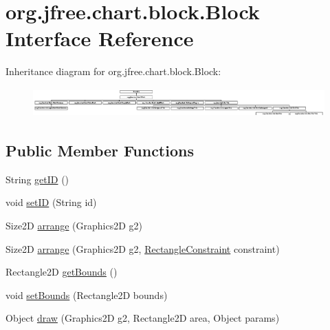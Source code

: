 \hypertarget{interfaceorg_1_1jfree_1_1chart_1_1block_1_1_block}{}\section{org.\+jfree.\+chart.\+block.\+Block Interface Reference}
\label{interfaceorg_1_1jfree_1_1chart_1_1block_1_1_block}
Inheritance diagram for org.\+jfree.\+chart.\+block.\+Block\+:\begin{figure}[H]
\begin{center}
\leavevmode
\includegraphics[height=1.115093cm]{interfaceorg_1_1jfree_1_1chart_1_1block_1_1_block}
\end{center}
\end{figure}
\subsection*{Public Member Functions}
\begin{DoxyCompactItemize}
\item 
String \mbox{\hyperlink{interfaceorg_1_1jfree_1_1chart_1_1block_1_1_block_ab362b055d3750130025daf376d874541}{get\+ID}} ()
\item 
void \mbox{\hyperlink{interfaceorg_1_1jfree_1_1chart_1_1block_1_1_block_acdfb9f36af8bef13785bb29e9752da58}{set\+ID}} (String id)
\item 
Size2D \mbox{\hyperlink{interfaceorg_1_1jfree_1_1chart_1_1block_1_1_block_a651d16c17fbf75d569fd29cf49ee8b9a}{arrange}} (Graphics2D g2)
\item 
Size2D \mbox{\hyperlink{interfaceorg_1_1jfree_1_1chart_1_1block_1_1_block_ab4cabbc237c5277a4a0018bab930e5fe}{arrange}} (Graphics2D g2, \mbox{\hyperlink{classorg_1_1jfree_1_1chart_1_1block_1_1_rectangle_constraint}{Rectangle\+Constraint}} constraint)
\item 
Rectangle2D \mbox{\hyperlink{interfaceorg_1_1jfree_1_1chart_1_1block_1_1_block_a9f7051224aeaddaf2c1099480394dafc}{get\+Bounds}} ()
\item 
void \mbox{\hyperlink{interfaceorg_1_1jfree_1_1chart_1_1block_1_1_block_a03c8d57948ba1a054d2ed56bc989c5a4}{set\+Bounds}} (Rectangle2D bounds)
\item 
Object \mbox{\hyperlink{interfaceorg_1_1jfree_1_1chart_1_1block_1_1_block_a1bac635d72de5ca6a71eff63dabf77a4}{draw}} (Graphics2D g2, Rectangle2D area, Object params)
\end{DoxyCompactItemize}



